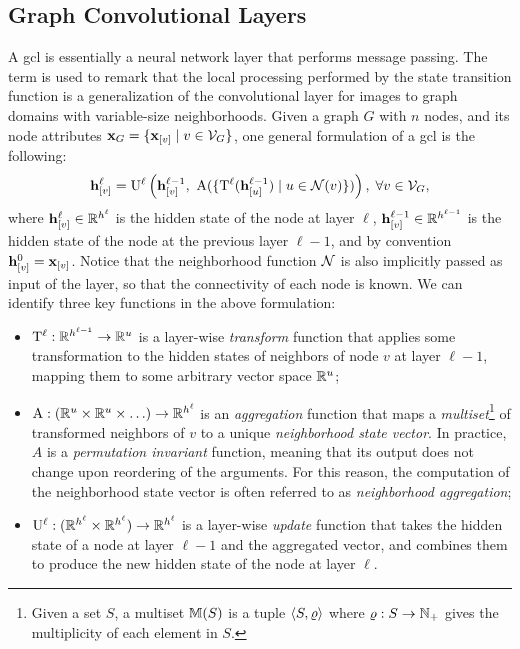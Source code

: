 \subsection{Graph Convolutional Layers}
A \gls{gcl} is essentially a neural network layer that performs message passing. The term  is used to remark that the local processing performed by the state transition function is a generalization of the convolutional layer for images to graph domains with variable-size neighborhoods. Given a graph $G$ with $n$ nodes, and its node attributes $\Vector{X}_G = \Set{\Elem{x}{v} \mid v \in \Cal{V}_G}$, one general formulation of a \gls{gcl} is the following:
\begin{align}
    \label{eq:simple-aggregation}
    \Elem{h}{v}^{\ell} = \Fun{U}^{\ell} \Paren{\Elem{h}{v}^{\ell-1},\ \Fun{A}(\Set{\Fun{T}^{\ell}(\Elem{h}{u}^{\ell-1}) \mid u \in \mathcal{N}(v)} )}, \; \forall v \in \Cal{V}_G,
\end{align}
where $\Elem{h}{v}^{\ell} \in \Real^{h^\ell}$ is the hidden state of the node at layer $\ell$, $\Elem{h}{v}^{\ell-1} \in \Real^{h^{\ell-1}}$ is the hidden state of the node at the previous layer $\ell-1$, and by convention $\Elem{h}{v}^{0} = \Elem{x}{v}$. Notice that the neighborhood function $\Cal{N}$ is also implicitly passed as input of the layer, so that the connectivity of each node is known. We can identify three key functions in the above formulation:
\begin{itemize}
    \item $\mathrm{T}^\ell: \mathbb{R}^{h^{\ell-1}} \rightarrow \mathbb{R}^u$ is a layer-wise \emph{transform} function that applies some transformation to the hidden states of neighbors of node $v$ at layer $\ell-1$, mapping them to some arbitrary vector space $\mathbb{R}^u$;
    \item $\mathrm{A}: (\mathbb{R}^u \times \mathbb{R}^u \times \ldots) \rightarrow \mathbb{R}^{h^{\ell}}$ is an \emph{aggregation} function that maps a \emph{multiset}\footnote{Given a set $S$, a multiset $\mathbb{M}(S)$ is a tuple $\langle S, \varrho \rangle$ where $\varrho: S \rightarrow \mathbb{N}_+$ gives the multiplicity of each element in $S$.} of transformed neighbors of $v$ to a unique \emph{neighborhood state vector}. In practice, $A$ is a \emph{permutation invariant} function, meaning that its output does not change upon reordering of the arguments. For this reason, the computation of the neighborhood state vector is often referred to as \emph{neighborhood aggregation};
    \item $\mathrm{U}^\ell: (\mathbb{R}^{h^{\ell}} \times \mathbb{R}^{h^{\ell}}) \rightarrow \mathbb{R}^{h^{\ell}}$ is a layer-wise \emph{update} function that takes the hidden state of a node at layer $\ell-1$ and the aggregated vector, and combines them to produce the new hidden state of the node at layer $\ell$.
\end{itemize}
